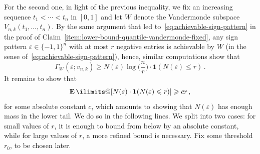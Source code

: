 \documentclass[11pt, letterpaper, hidelinks]{article}
\makeatletter
\newcommand{\1}{\mathbf 1}
\newcommand{\eps}{\varepsilon}
\renewcommand{\leq}{\leqslant}
\renewcommand{\geq}{\geqslant}
\newcommand{\E}{\operatorname*{\mathbf{E}}\ilimits@}
\theoremstyle{plain}
\theoremstyle{definition}
\makeatother
\begin{document}
For the second one, in light of the previous inequality, we fix an increasing sequence $t_1 < \cdots < t_n$ in $[0,1]$ and let $W$ denote the Vandermonde subspace $V_{n,k}(t_1, \dots, t_n)$. By the same argument that led to~\eqref{eq:achievable-sign-pattern} in the proof of Claim~\ref{item:lower-bound-quantile-vandermonde-fixed}, any sign pattern $\eps \in \{-1,1\}^n$ with at most $r$ negative entries is achievable by $W$ (in the sense of~\eqref{eq:achievable-sign-pattern}), hence, similar computations show that 
\begin{equation}
\label{eq:binom-lower-bound}
	\Gamma_W(\eps; v_{n,k}) \geq N(\eps) \log\Big(\frac n r\Big) \cdot \1(N(\eps) \leq r) \, .
\end{equation}
It remains to show that
\begin{equation}
\label{eq:trunc-mom-1}
\E[N(\eps) \cdot \1(N(\eps) \leq r) ] \geq c r	\, ,
\end{equation}
for some absolute constant $c$, which amounts to showing that $N(\eps)$ has enough mass in the lower tail. We do so in the following lines. We split into two cases: for small values of $r$, it is enough to bound from below by an absolute constant, while for large values of $r$, a more refined bound is necessary. Fix some threshold $r_0$, to be chosen later.
\end{document}
